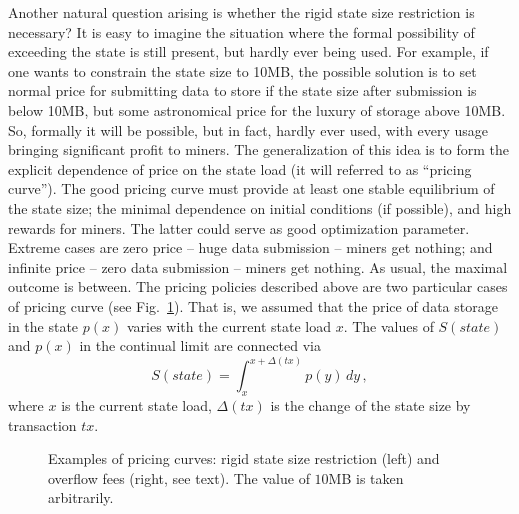 \documentclass[]{llncs}   %
\begin{document}
Another natural question arising is whether the rigid state size restriction is
necessary?  It is easy to imagine the situation where the formal possibility of
exceeding the state is still present, but hardly ever being used. For example,
if one wants to constrain the state size to 10MB, the possible solution is to
set normal price for submitting data to store if the state size after submission
is below 10MB, but some astronomical price for the luxury of storage above 10MB.
So, formally it will be possible, but in fact, hardly ever used, with every
usage bringing significant profit to miners. The generalization of this idea is
to form the explicit dependence of price on the state load (it will referred to
as ``pricing curve''). The good pricing curve must provide at least one stable
equilibrium of the state size; the minimal dependence on initial conditions (if
possible), and high rewards for miners. The latter could serve as good
optimization parameter. Extreme cases are zero price -- huge data submission --
miners get nothing; and infinite price -- zero data submission -- miners get
nothing. As usual, the maximal outcome is between.  The pricing policies
described above are two particular cases of pricing curve (see
Fig.~\ref{fig:steps}). That is, we assumed that the price of data storage in the
state $p(x)$ varies with the current state load $x$. The values of $S(state)$
and $p(x)$ in the continual limit are connected via
\begin{equation}
    S(state)=\int_x^{x+\Delta(tx)}p(y)\,dy\,,
    \label{eq:Sp}
\end{equation}
where $x$ is the current state load, $\Delta(tx)$ is the change of the state
size by transaction $tx$.
\begin{figure} 
    \hfill 
    \hfill 
    \hfill 
    \caption{ 
        Examples of pricing curves: rigid state size restriction (left) and 
        overflow fees (right, see text). The value of $10$MB is taken 
        arbitrarily. 
        \label{fig:steps} 
    } 
\end{figure} 
\end{document}
